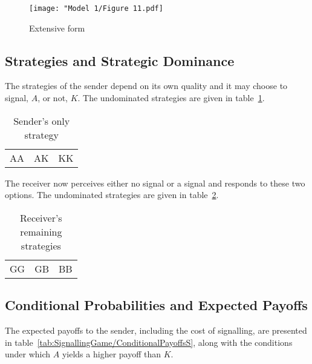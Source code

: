 \documentclass[a4paper,12pt]{article}
\numberwithin{equation}{section}
\begin{document}
\begin{figure}[h]
\begin{center}
\leavevmode
\texttt{[image: "Model 1/Figure 11.pdf]}
\caption{Extensive form}
\label{fig:Model 1/Figure 11.pdf}
\end{center}
\end{figure}


\subsection{Strategies and Strategic Dominance}
\label{sec:Signalling Game/Strategic Dominance}

The strategies of the sender depend on its own quality and it may choose to signal, $A$, or not, $K$. The undominated strategies are given in table~\ref{tab:SignallingGame/StrategiesS}.

\begin{table}[h]
\begin{center}
\begin{tabular}{ccc}
AA & AK & KK
\end{tabular}
\end{center}
\caption{Sender's only strategy}
\label{tab:SignallingGame/StrategiesS}
\end{table}

The receiver now perceives either no signal or a signal and responds to these two options. The undominated strategies are given in table~\ref{tab:SignallingGame/StrategiesR}.

\begin{table}[h]
\begin{center}
\begin{tabular}{ccc}
GG & GB & BB
\end{tabular}
\end{center}
\caption{Receiver's remaining strategies}
\label{tab:SignallingGame/StrategiesR}
\end{table}


\subsection{Conditional Probabilities and Expected Payoffs}
\label{sec:Signalling Game/Conditional Payoffs}

The expected payoffs to the sender, including the cost of signalling, are presented in table~\ref{tab:SignallingGame/ConditionalPayoffsS}, along with the conditions under which $A$ yields a higher payoff than $K$.
\end{document}
